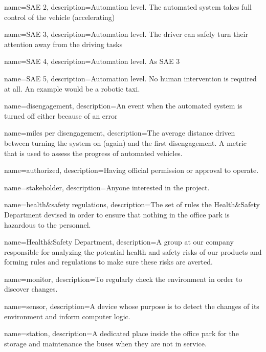 {%
	name={SAE 2},
	description={Automation level. The automated system takes full control
	of the vehicle (accelerating)}
}

{%
	name={SAE 3},
	description={Automation level. The driver can safely turn their
	attention away from the driving tasks}
}

{%
	name={SAE 4},
	description={Automation level. As SAE 3}
}

{%
	name={SAE 5},
	description={Automation level. No human intervention is required at all.
	An example would be a robotic taxi.}
}

{%
	name={disengagement},
	description={An event when the automated system is turned off either
	because of an error}
}

{%
	name={miles per disengagement},
	description={The average distance driven between turning the system on
	(again) and the first disengagement. A metric that is used to assess the
	progress of automated vehicles.}
}

{%
	name={authorized},
	description={Having official permission or approval to operate.}
}

{%
	name={stakeholder},
	description={Anyone interested in the project.}
}

{%
	name={health\&safety regulations},
	description={The set of rules the Health\&Safety Department devised in
	order to ensure that nothing in the office park is hazardous to the
	personnel.}
}

{%
	name={Health\&Safety Department},
	description={A group at our company responsible for analyzing the
	potential health and safety risks of our products and forming rules and
	regulations to make sure these risks are averted.}
}

{%
	name={monitor},
	description={To regularly check the environment in order to discover
	changes.}
}

{%
	name={sensor},
	description={A device whose purpose is to detect the changes of its
	environment and inform computer logic.}
}

{%
	name={station},
	description={A dedicated place inside the office park for the storage
	and maintenance the buses when they are not in service.}
}

